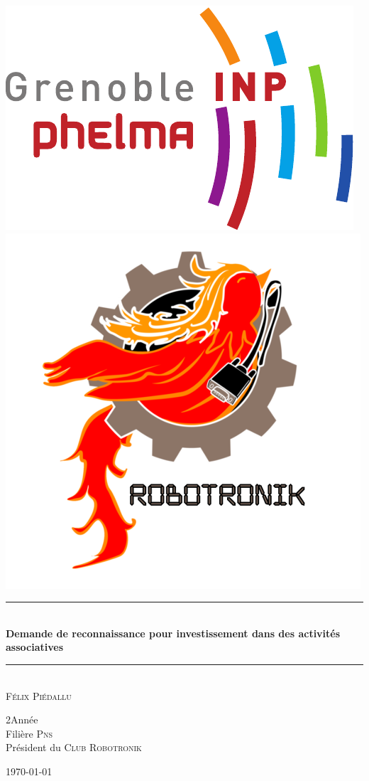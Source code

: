\begin{titlepage}
\includegraphics[scale=0.45]{Public/logo_phelma.pdf}\hfill\includegraphics[scale=0.55]{Public/logo_robotronik.png}
\begin{center}
    \vspace*{2cm}
    \rule{\linewidth}{0.5mm}\\[0.4cm]
    {\huge\bfseries Demande de reconnaissance pour investissement dans des activités associatives\\
    [0.4cm]}\rule{\linewidth}{0.5mm}\\[1.0cm]
    \large{\textsc{Félix Piédallu}}
    \begin{flushright} \large
        2\ieme Année \\
        Filière \textsc{Pns} \\
        Président du \textsc{Club Robotronik}\\
    \end{flushright}
    \vfill

    \large{\today}
\end{center}
\end{titlepage}
